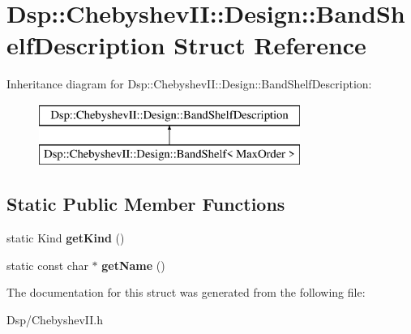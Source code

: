 \hypertarget{structDsp_1_1ChebyshevII_1_1Design_1_1BandShelfDescription}{\section{Dsp\-:\-:Chebyshev\-I\-I\-:\-:Design\-:\-:Band\-Shelf\-Description Struct Reference}
\label{structDsp_1_1ChebyshevII_1_1Design_1_1BandShelfDescription}
}
Inheritance diagram for Dsp\-:\-:Chebyshev\-I\-I\-:\-:Design\-:\-:Band\-Shelf\-Description\-:\begin{figure}[H]
\begin{center}
\leavevmode
\includegraphics[height=2.000000cm]{structDsp_1_1ChebyshevII_1_1Design_1_1BandShelfDescription}
\end{center}
\end{figure}
\subsection*{Static Public Member Functions}
\begin{DoxyCompactItemize}
\item 
\hypertarget{structDsp_1_1ChebyshevII_1_1Design_1_1BandShelfDescription_a31982fc2ef7d2f249ee8de1b90faad97}{static Kind {\bfseries get\-Kind} ()}\label{structDsp_1_1ChebyshevII_1_1Design_1_1BandShelfDescription_a31982fc2ef7d2f249ee8de1b90faad97}

\item 
\hypertarget{structDsp_1_1ChebyshevII_1_1Design_1_1BandShelfDescription_ad724aed8ba666702471098591e43a312}{static const char $\ast$ {\bfseries get\-Name} ()}\label{structDsp_1_1ChebyshevII_1_1Design_1_1BandShelfDescription_ad724aed8ba666702471098591e43a312}

\end{DoxyCompactItemize}


The documentation for this struct was generated from the following file\-:\begin{DoxyCompactItemize}
\item 
Dsp/Chebyshev\-I\-I.\-h\end{DoxyCompactItemize}
